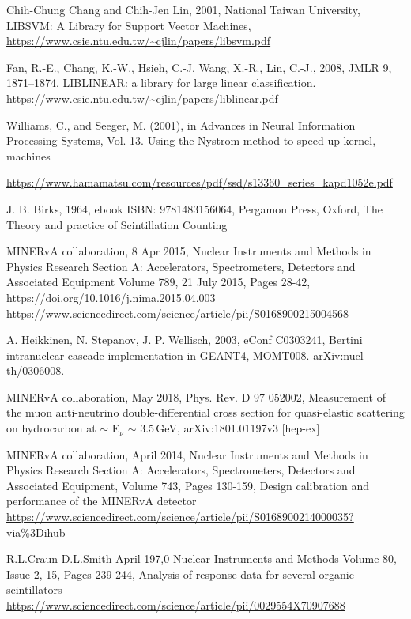 \documentclass[12pt,a4paper]{article}
\begin{document}
\begin{thebibliography}{9}
Chih-Chung Chang and Chih-Jen Lin, 2001, National Taiwan University, LIBSVM: A Library for Support Vector Machines,  \url{https://www.csie.ntu.edu.tw/~cjlin/papers/libsvm.pdf} 

 Fan, R.-E., Chang, K.-W., Hsieh, C.-J, Wang, X.-R., Lin, C.-J., 2008, JMLR 9, 1871–1874, LIBLINEAR: a library for large linear classification.  \url{https://www.csie.ntu.edu.tw/~cjlin/papers/liblinear.pdf}

Williams, C., and Seeger, M. (2001), in Advances in Neural Information Processing Systems, Vol. 13. Using the Nystrom method to speed up kernel, machines

\url{https://www.hamamatsu.com/resources/pdf/ssd/s13360_series_kapd1052e.pdf}

J. B. Birks, 1964, ebook ISBN: 9781483156064, Pergamon Press, Oxford, The Theory and practice of Scintillation Counting

MINERvA collaboration, 8 Apr 2015, Nuclear Instruments and Methods in Physics Research Section A: Accelerators, Spectrometers, Detectors and Associated Equipment Volume 789, 21 July 2015, Pages 28-42, https://doi.org/10.1016/j.nima.2015.04.003 \url{https://www.sciencedirect.com/science/article/pii/S0168900215004568}

A. Heikkinen, N. Stepanov, J. P. Wellisch, 2003, eConf C0303241, Bertini intranuclear cascade implementation in GEANT4,  MOMT008. arXiv:nucl-th/0306008.

MINERvA collaboration, May 2018, Phys. Rev. D 97 052002, Measurement of the muon anti-neutrino double-differential cross section for quasi-elastic scattering on hydrocarbon at $\sim$ E$_\nu$ $\sim$ 3.5\,GeV, arXiv:1801.01197v3 [hep-ex]

MINERvA collaboration, April 2014, Nuclear Instruments and Methods in Physics Research Section A: Accelerators, Spectrometers, Detectors and Associated Equipment, Volume 743, Pages 130-159, Design calibration and performance of the MINERvA detector \url{https://www.sciencedirect.com/science/article/pii/S0168900214000035?via\%3Dihub}

R.L.Craun D.L.Smith  April 197,0 Nuclear Instruments and Methods Volume 80, Issue 2, 15, Pages 239-244, Analysis of response data for several organic scintillators \url{https://www.sciencedirect.com/science/article/pii/0029554X70907688}



\end{thebibliography}
\end{document}

